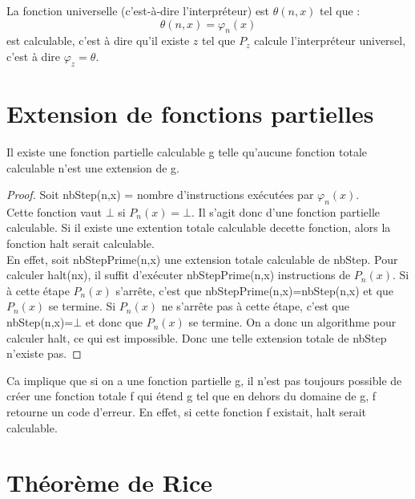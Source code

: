 \begin{mytheo}
  \label{theo:fununiv}
	La fonction universelle (c'est-à-dire l'interpréteur) est $\theta(n,x)$ tel que :
	\[ \theta(n,x) = \varphi_n(x) \]
    est calculable, c'est à dire qu'il existe $z$ tel que $P_z$ calcule l'interpréteur universel,
    c'est à dire $\varphi_z = \theta$.
\end{mytheo}


\section{Extension de fonctions partielles}
\label{sec:extension_de_fonctions_partielles}

\begin{mytheo}
	Il existe une fonction partielle calculable g telle qu'aucune fonction totale calculable n'est une extension de g.
  \begin{proof}
    Soit nbStep(n,x)  = nombre d'instructions exécutées par $\varphi_n(x)$.\\
    Cette fonction vaut $\bot$ si $P_n(x) = \bot$. Il s'agit donc d'une fonction partielle calculable. Si il existe une extention totale calculable decette fonction, alors la fonction halt serait calculable.\\
    En effet, soit nbStepPrime(n,x) une extension totale calculable de nbStep. Pour calculer halt(nx), il suffit d'exécuter nbStepPrime(n,x) instructions de $P_n(x)$.  Si à cette étape $P_n(x)$ s'arrête, c'est que nbStepPrime(n,x)=nbStep(n,x) et que $P_n(x)$ se termine.  Si $P_n(x)$ ne s'arrête pas à cette étape, c'est que nbStep(n,x)=$\bot$ et donc que $P_n(x)$ se termine. On a donc un algorithme pour calculer halt, ce qui est impossible.  Donc une telle extension totale de nbStep n'existe pas.
  \end{proof}
\end{mytheo}

\begin{myrem}
	Ca implique que si on a une fonction partielle g, il n'est pas
	toujours possible de créer une fonction totale f qui étend g
	tel que en dehors du domaine de g, f retourne un code d'erreur.  En effet, si cette fonction f existait, halt serait calculable.
\end{myrem}


\section{Théorème de Rice}
\label{sub:theoreme_de_rice}

